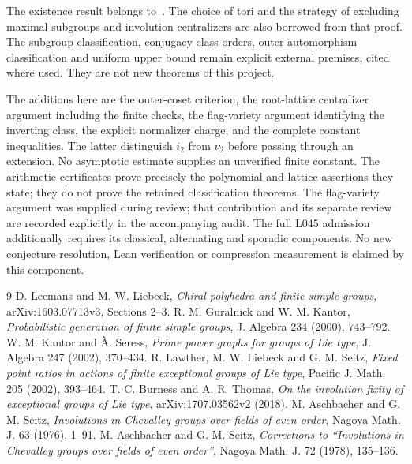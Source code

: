 \documentclass[10pt,a4paper]{article}
\begin{document}
The existence result belongs to~\cite{LL}. The choice of tori and the
strategy of excluding maximal subgroups and involution centralizers are
also borrowed from that proof. The subgroup classification, conjugacy
class orders, outer-automorphism classification and uniform upper bound
remain explicit external premises, cited where used. They are not new
theorems of this project.

The additions here are the outer-coset criterion, the root-lattice
centralizer argument including the finite checks, the flag-variety
argument identifying the inverting class, the explicit normalizer
charge, and the complete constant inequalities. The latter distinguish
$i_2$ from $\nu_2$ before passing through an extension. No asymptotic
estimate supplies an unverified finite constant. The arithmetic certificates
prove precisely the polynomial and lattice assertions they state;
they do not prove the retained classification theorems.
The flag-variety argument was supplied during review; that contribution
and its separate review are recorded explicitly in the accompanying audit.
The full L045 admission additionally requires its classical, alternating
and sporadic components. No new conjecture resolution, Lean verification
or compression measurement is claimed by this component.

\clearpage
\begin{thebibliography}{9}\small
{} D. Leemans and M. W. Liebeck, \emph{Chiral polyhedra and
finite simple groups}, arXiv:1603.07713v3, Sections 2--3.
 R. M. Guralnick and W. M. Kantor, \emph{Probabilistic
generation of finite simple groups}, J. Algebra 234 (2000), 743--792.
 W. M. Kantor and \`A. Seress, \emph{Prime power graphs
for groups of Lie type}, J. Algebra 247 (2002), 370--434.
 R. Lawther, M. W. Liebeck and G. M. Seitz,
\emph{Fixed point ratios in actions of finite exceptional groups of
Lie type}, Pacific J. Math. 205 (2002), 393--464.
 T. C. Burness and A. R. Thomas, \emph{On the involution
fixity of exceptional groups of Lie type}, arXiv:1707.03562v2 (2018).
 M. Aschbacher and G. M. Seitz, \emph{Involutions in
Chevalley groups over fields of even order}, Nagoya Math. J. 63
(1976), 1--91.
 M. Aschbacher and G. M. Seitz, \emph{Corrections to
``Involutions in Chevalley groups over fields of even order''},
Nagoya Math. J. 72 (1978), 135--136.
\end{thebibliography}
\end{document}
